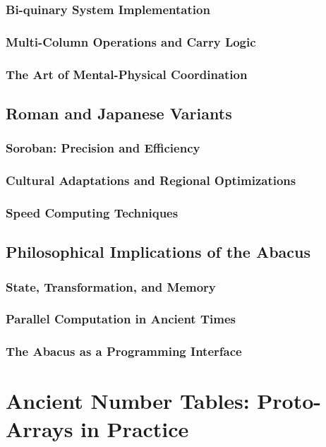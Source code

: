 \documentclass[12pt, oneside, openany]{book}
\begin{document}
\subsubsection{Bi-quinary System Implementation}
\subsubsection{Multi-Column Operations and Carry Logic}
\subsubsection{The Art of Mental-Physical Coordination}

\subsection{Roman and Japanese Variants}
\subsubsection{Soroban: Precision and Efficiency}
\subsubsection{Cultural Adaptations and Regional Optimizations}
\subsubsection{Speed Computing Techniques}

\subsection{Philosophical Implications of the Abacus}
\subsubsection{State, Transformation, and Memory}
\subsubsection{Parallel Computation in Ancient Times}
\subsubsection{The Abacus as a Programming Interface}

\section{Ancient Number Tables: Proto-Arrays in Practice}
\end{document}
